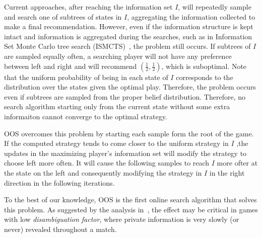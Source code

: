 \documentclass{aamas2015}
\begin{document}
Current approaches, after reaching the information set $I$, will repeatedly sample and search one of subtrees of states in $I$, aggregating the information collected to make a final recommendation.
However, even if the information structure is kept intact and information is aggregated during the searches, such as in Information Set Monte Carlo tree search (ISMCTS)~\cite{Cowling12ISMCTS}, the problem still occurs. If subtrees of $I$ are sampled equally often, a searching player will not have any preference between left and right and will recommend $(\frac{1}{2},\frac{1}{2})$, which is suboptimal.
Note that the uniform probability of being in each state of $I$ corresponds to the distribution over the states given the optimal play. Therefore, the problem occurs even if subtrees are sampled from the proper belief distribution. Therefore, no search algorithm starting only from the current state without some extra informaiton cannot converge to the optimal strategy.

OOS overcomes this problem by starting each sample form the root of the game. If the computed strategy tends to come closer to the uniform strategy in $I$ ,the updates in the maximizing player's information set will modify the strategy to choose left more often. It will cause the following samples to reach $I$ more ofter at the state on the left and consequently modifying the strategy in $I$ in the right direction in the following iterations.


To the best of our knowledge, OOS is the first online search algorithm that solves this problem. As suggested by the analysis in~\cite{Long10Understanding}, the effect may be critical in games with low {\it disambiguation factor}, where private information is very slowly (or never) revealed throughout a match.
\end{document}
